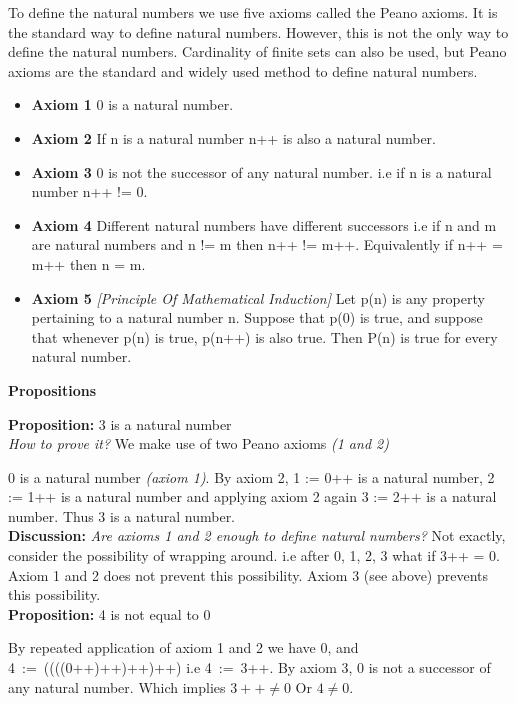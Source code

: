 \documentclass[10pt]{article}
\begin{document}
To define the natural numbers we use five axioms called the Peano axioms. It is
the standard way to define natural numbers.
However, this is not the only way to define the natural numbers. Cardinality of
finite sets can also be used, but Peano axioms are the standard and widely used
method to define natural numbers.

\begin{itemize}
\setlength{\itemsep}{0pt}
\item[] \textbf{Axiom 1} 0 is a natural number.
\item[] \textbf{Axiom 2} If n is a natural number n++ is also a natural number.
\item[] \textbf{Axiom 3} 0 is not the successor of any natural number. i.e if n is a natural
number n++ != 0.
\item[] \textbf{Axiom 4} Different natural numbers have different successors i.e if n and m are
natural numbers and n != m then n++ != m++. Equivalently if n++ = m++ then n = m.
\item[] \textbf{Axiom 5} \emph{[Principle Of Mathematical Induction]} Let p(n) is any property pertaining
to a natural number n. Suppose that p(0) is true, and suppose that whenever p(n)
is true, p(n++) is also true. Then P(n) is true for every natural number.
\end{itemize}

\begin{flushleft}
\textbf{\large{Propositions}}
\end{flushleft}

\textbf{Proposition:} 3 is a natural number
\\[4pt]
\emph{How to prove it?} We make use of two Peano axioms \emph{(1 and 2)}

0 is a natural number \emph{(axiom 1)}. By axiom 2, 1 := 0++ is a natural
number, 2 := 1++ is a natural number and applying axiom 2 again 3 := 2++ is a
natural number. Thus 3 is a natural number.
\\[4pt]
\textbf{Discussion:} \emph{Are axioms 1 and 2 enough to define natural numbers?}
Not exactly, consider the possibility of wrapping around. i.e after 0, 1, 2, 3
what if 3++ = 0. Axiom 1 and 2 does not prevent this possibility. Axiom 3 (see
above) prevents this possibility.
\\[4pt]
\textbf{Proposition:} 4 is not equal to 0

By repeated application of axiom 1 and 2 we have 0, and 4~:=~((((0++)\-++)++)++)
i.e 4~:=~3++. By axiom 3, 0 is not a successor of any natural number. Which
implies $3++ \ne  0$ Or $4 \ne 0$.
\end{document}
